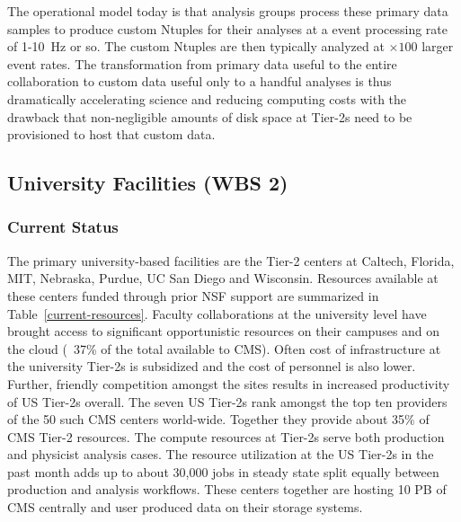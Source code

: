 \documentclass[11pt,a4paper]{article}
\begin{document}
The operational model today is that analysis groups process these primary
data samples to produce custom Ntuples for their analyses at a event processing
rate of 1-10~Hz or so. The custom Ntuples are then typically analyzed at
$\times 100$ larger event rates. The transformation from primary data useful to the
entire collaboration to custom data useful only to a handful analyses is
thus dramatically accelerating science and reducing computing costs with
the drawback that non-negligible amounts of disk space at Tier-2s need to
be provisioned to host that custom data. 

\subsection{University Facilities (WBS 2)}

\subsubsection{Current Status}

The primary university-based facilities are the Tier-2 centers at Caltech,
Florida, MIT, Nebraska, Purdue, UC San Diego and Wisconsin.  Resources
available at these centers funded through prior NSF support are summarized
in Table~\ref{current-resources}.  Faculty collaborations at the university
level have brought access to significant opportunistic resources on their
campuses and on the cloud (~37\% of the total available to CMS).  Often
cost of infrastructure at the university Tier-2s is subsidized and the cost
of personnel is also lower.  Further, friendly competition amongst the
sites results in increased productivity of US Tier-2s overall.  The seven
US Tier-2s rank amongst the top ten providers of the 50 such CMS centers
world-wide. Together they provide about 35\% of CMS Tier-2 resources.  The
compute resources at Tier-2s serve both production and physicist analysis
cases.  The resource utilization at the US Tier-2s in the past month adds
up to about 30,000 jobs in steady state split equally between production
and analysis workflows.  These centers together are hosting 10 PB of CMS
centrally and user produced data on their storage systems.
\end{document}

